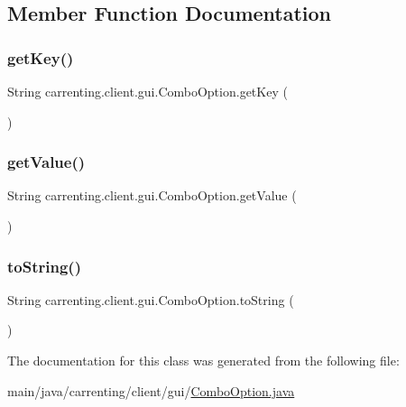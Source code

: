 \subsection{Member Function Documentation}
\mbox{\label{classcarrenting_1_1client_1_1gui_1_1_combo_option_a8dd8eb94c6eb73f914706379815e1dbf}} 
\subsubsection{\texorpdfstring{getKey()}{getKey()}}
{\footnotesize\ttfamily String carrenting.\+client.\+gui.\+Combo\+Option.\+get\+Key (\begin{DoxyParamCaption}{ }\end{DoxyParamCaption})}

\mbox{\label{classcarrenting_1_1client_1_1gui_1_1_combo_option_aa305470a1e2867419c25ab82cd224d66}} 
\subsubsection{\texorpdfstring{getValue()}{getValue()}}
{\footnotesize\ttfamily String carrenting.\+client.\+gui.\+Combo\+Option.\+get\+Value (\begin{DoxyParamCaption}{ }\end{DoxyParamCaption})}

\mbox{\label{classcarrenting_1_1client_1_1gui_1_1_combo_option_ab988800ea25c9b73568f8860bd85393b}} 
\subsubsection{\texorpdfstring{toString()}{toString()}}
{\footnotesize\ttfamily String carrenting.\+client.\+gui.\+Combo\+Option.\+to\+String (\begin{DoxyParamCaption}{ }\end{DoxyParamCaption})}



The documentation for this class was generated from the following file\+:\begin{DoxyCompactItemize}
\item 
main/java/carrenting/client/gui/\mbox{\hyperlink{_combo_option_8java}{Combo\+Option.\+java}}\end{DoxyCompactItemize}
